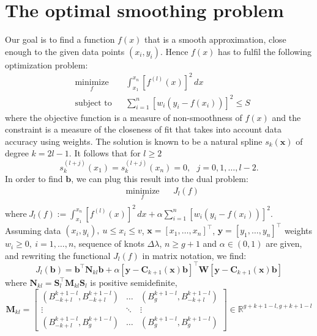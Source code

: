 \section{The optimal smoothing problem} \label{optimal}
Our goal is to find a function $f(x)$ that is a smooth approximation, close enough to the given data points $(x_i,y_i)$. Hence $f(x)$ has to fulfil the following optimization problem:
\begin{equation*} 
\begin{aligned}
& \underset{f}{\text{minimize}}
& & \int_{x_1}^{x_n} [f^{(l)}(x)]^2 \,dx \\
& \text{subject to}
& & \sum\limits_{i=1}^{n}[w_i(y_i-f(x_i))]^2 \le S
\end{aligned}
\end{equation*}
where the objective function is a measure of non-smoothness of $f(x)$ and the constraint is a measure of the closeness of fit that takes into account data accuracy using weights.
The solution is known to be a natural spline $s_k(\textbf{x})$ of degree $k=2l-1$.
It follows that for $l \ge 2$  
\[s_k^{(l+j)}(x_1)=s_k^{(l+j)}(x_n)=0, \ \ \ j=0,1,\dots,l-2.\]
In order to find $\textbf{b}$, we can plug this result into the dual problem:
\begin{equation*} 
\begin{aligned}
& \underset{f}{\text{minimize}}
& &  J_l(f) \\
\end{aligned}
\end{equation*}
$\text{where} \ J_l(f) :=\int_{x_1}^{x_n} [f^{(l)}(x)]^2 \,dx + \alpha \sum\limits_{i=1}^{n}[w_i(y_i-f(x_i))]^2$.\\
Assuming data $(x_i,y_i), \ u\le x_i \le v$, $\textbf{x} = [x_1, \dots, x_n]^\top$, $\textbf{y} = [y_1, \dots, y_n]^\top$ weights $w_i \ge 0, \ i=1, \dots, n$, sequence of knots $\Delta\lambda$, $n \ge g+1 $ and $\alpha \in (0,1)$ are given, %
and rewriting the functional $J_l(f)$ in matrix notation, we find:
\[J_l(\textbf{b}) = \textbf{b}^\top \textbf{N}_{kl}\textbf{b} + \alpha [\textbf{y}-\textbf{C}_{k+1}(\textbf{x})\textbf{b}]^\top \textbf{W} [\textbf{y}-\textbf{C}_{k+1}(\textbf{x})\textbf{b}]\]
where $\textbf{N}_{kl} =  \textbf{S}_l^\top \textbf{M}_{kl}\textbf{S}_l$ is positive semidefinite, 
\[  \textbf{M}_{kl} =
\begin{bmatrix}
(B_{-k+l}^{k+1-l}, B_{-k+l}^{k+1-l}) & \dots  & (B_{g}^{k+1-l}, B_{-k+l}^{k+1-l}) \\
\vdots & \ddots & \vdots \\
(B_{-k+l}^{k+1-l}, B_{g}^{k+1-l}) &  \dots  & (B_{g}^{k+1-l}, B_{g}^{k+1-l})
\end{bmatrix} \in \mathbb{R}^{g+k+1-l, g+k+1-l} \]
